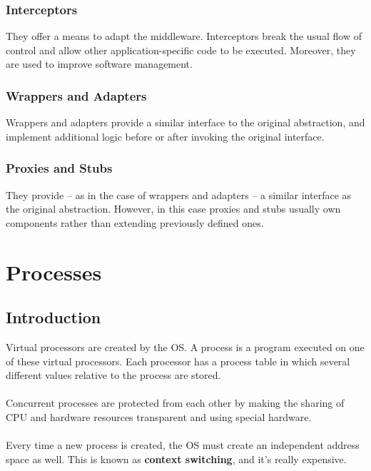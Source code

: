 \documentclass{article}
\begin{document}
\subsubsection{Interceptors}
They offer a means to adapt the middleware. Interceptors break the usual flow of control and allow other application-specific code to be executed. Moreover, they are used to improve software management.

\subsubsection{Wrappers and Adapters}
Wrappers and adapters provide a similar interface to the original abstraction, and implement additional logic before or after invoking the original interface.

\subsubsection{Proxies and Stubs}
They provide -- as in the case of wrappers and adapters -- a similar interface as the original abstraction. However, in this case proxies and stubs usually own components rather than extending previously defined ones.

\section{Processes}
\subsection{Introduction}
Virtual processors are created by the OS. A process is a program executed on one of these virtual processors. Each processor has a process table in which several different values relative to the process are stored. \\ \\
Concurrent processes are protected from each other by making the sharing of CPU and hardware resources transparent and using special hardware. \\ \\
Every time a new process is created, the OS must create an independent address space as well. This is known as \textbf{context switching}, and it's really expensive.
\end{document}
